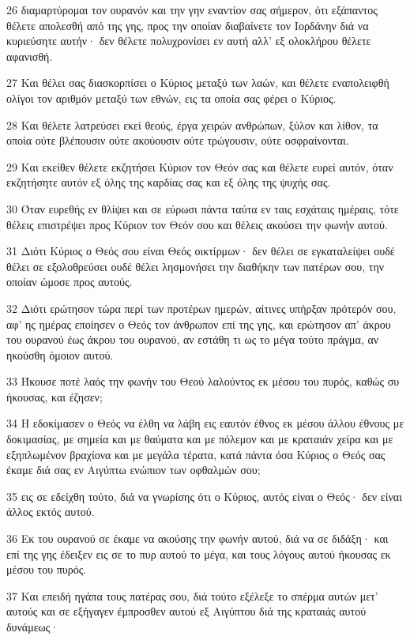 \par 26 διαμαρτύρομαι τον ουρανόν και την γην εναντίον σας σήμερον, ότι εξάπαντος θέλετε απολεσθή από της γης, προς την οποίαν διαβαίνετε τον Ιορδάνην διά να κυριεύσητε αυτήν· δεν θέλετε πολυχρονίσει εν αυτή αλλ' εξ ολοκλήρου θέλετε αφανισθή.
\par 27 Και θέλει σας διασκορπίσει ο Κύριος μεταξύ των λαών, και θέλετε εναπολειφθή ολίγοι τον αριθμόν μεταξύ των εθνών, εις τα οποία σας φέρει ο Κύριος.
\par 28 Και θέλετε λατρεύσει εκεί θεούς, έργα χειρών ανθρώπων, ξύλον και λίθον, τα οποία ούτε βλέπουσιν ούτε ακούουσιν ούτε τρώγουσιν, ούτε οσφραίνονται.
\par 29 Και εκείθεν θέλετε εκζητήσει Κύριον τον Θεόν σας και θέλετε ευρεί αυτόν, όταν εκζητήσητε αυτόν εξ όλης της καρδίας σας και εξ όλης της ψυχής σας.
\par 30 Όταν ευρεθής εν θλίψει και σε εύρωσι πάντα ταύτα εν ταις εσχάταις ημέραις, τότε θέλεις επιστρέψει προς Κύριον τον Θεόν σου και θέλεις ακούσει την φωνήν αυτού.
\par 31 Διότι Κύριος ο Θεός σου είναι Θεός οικτίρμων· δεν θέλει σε εγκαταλείψει ουδέ θέλει σε εξολοθρεύσει ουδέ θέλει λησμονήσει την διαθήκην των πατέρων σου, την οποίαν ώμοσε προς αυτούς.
\par 32 Διότι ερώτησον τώρα περί των προτέρων ημερών, αίτινες υπήρξαν πρότερόν σου, αφ' ης ημέρας εποίησεν ο Θεός τον άνθρωπον επί της γης, και ερώτησον απ' άκρου του ουρανού έως άκρου του ουρανού, αν εστάθη τι ως το μέγα τούτο πράγμα, αν ηκούσθη όμοιον αυτού.
\par 33 Ήκουσε ποτέ λαός την φωνήν του Θεού λαλούντος εκ μέσου του πυρός, καθώς συ ήκουσας, και έζησεν;
\par 34 Η εδοκίμασεν ο Θεός να έλθη να λάβη εις εαυτόν έθνος εκ μέσου άλλου έθνους με δοκιμασίας, με σημεία και με θαύματα και με πόλεμον και με κραταιάν χείρα και με εξηπλωμένον βραχίονα και με μεγάλα τέρατα, κατά πάντα όσα Κύριος ο Θεός σας έκαμε διά σας εν Αιγύπτω ενώπιον των οφθαλμών σου;
\par 35 εις σε εδείχθη τούτο, διά να γνωρίσης ότι ο Κύριος, αυτός είναι ο Θεός· δεν είναι άλλος εκτός αυτού.
\par 36 Εκ του ουρανού σε έκαμε να ακούσης την φωνήν αυτού, διά να σε διδάξη· και επί της γης έδειξεν εις σε το πυρ αυτού το μέγα, και τους λόγους αυτού ήκουσας εκ μέσου του πυρός.
\par 37 Και επειδή ηγάπα τους πατέρας σου, διά τούτο εξέλεξε το σπέρμα αυτών μετ' αυτούς και σε εξήγαγεν έμπροσθεν αυτού εξ Αιγύπτου διά της κραταιάς αυτού δυνάμεως·
